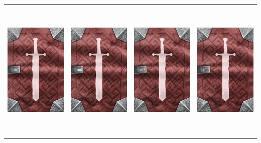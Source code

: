 \documentclass{minimal}
\begin{document}
{\begin{longtable}{llll}
\includegraphics[width=44mm,height=68mm]{./64-151/gh-107-horned-helm-back.png} &
\includegraphics[width=44mm,height=68mm]{./64-151/gh-106-necklace-of-teeth-back.png} &
\includegraphics[width=44mm,height=68mm]{./64-151/gh-105-flea-bitten-shawl-back.png} &
\includegraphics[width=44mm,height=68mm]{./64-151/gh-104-steam-armor-back.png}\\ 

\end{longtable}}
\end{document}
